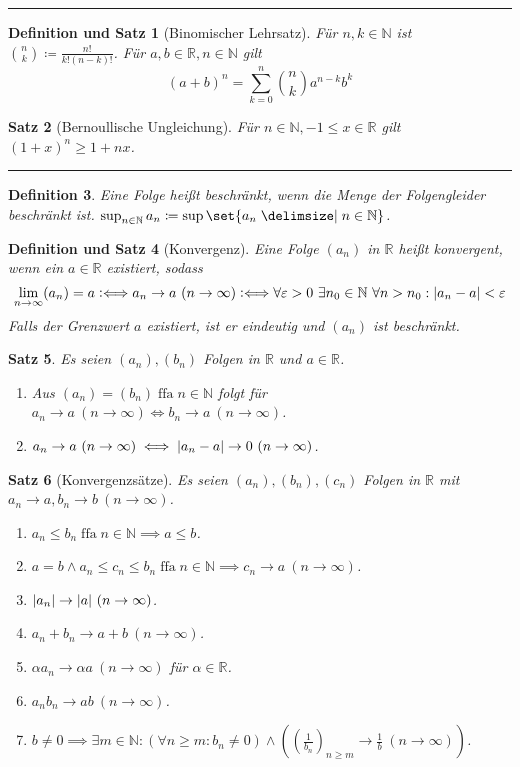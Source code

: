 \documentclass[a4paper]{article}
\newcounter{Sec}
\theoremstyle{marginbreak}
\newtheorem{definition}{Definition}[Sec]
\newtheorem{satz}[definition]{Satz}
\newtheorem{defsatz}[definition]{Definition und Satz}
\DeclareMathOperator{\ffa}{ffa}
\newcommand{\sep}{%
	\rule{\textwidth}{0.3pt}%
	\stepcounter{Sec}%
	}
\newcommand{\defiff}{\mathrel{\vcentcolon\Longleftrightarrow}}
\newcommand{\en}{~(n\to\infty)}
\begin{document}
	\sep
	\begin{defsatz}[Binomischer Lehrsatz]
		Für $n, k\in\mathbb{N}$ ist $\binom{n}{k}\coloneqq\frac{n!}{k!(n-k)!}$.
		Für $a, b\in\mathbb{R}, n\in\mathbb{N}$ gilt
		\[(a+b)^n = \sum_{k=0}^n\binom{n}{k}a^{n-k}b^k\]
	\end{defsatz}
	\begin{satz}[Bernoullische Ungleichung]
		Für $n\in\mathbb{N}, -1\leq x\in\mathbb{R}$ gilt $(1+x)^n\geq1+nx$.
	\end{satz}
	\sep
	\begin{definition}
		Eine Folge heißt beschränkt, wenn die Menge der Folgengleider beschränkt
		ist. $\sup_{n\in\mathbb{N}}a_n\coloneqq\sup\set{a_n\given n\in\mathbb{N}}$.
	\end{definition}
	\begin{defsatz}[Konvergenz]
		Eine Folge $(a_n)$ in $\mathbb{R}$ heißt konvergent, wenn ein $a\in\mathbb{R}$ existiert, sodass
		\[\lim_{n\to\infty}(a_n) = a \defiff a_n\to a\en \defiff
			\forall\varepsilon>0~\exists n_0\in\mathbb{N}~\forall n>n_0:\abs{a_n-a}<\varepsilon\]
		Falls der Grenzwert $a$ existiert, ist er eindeutig und $(a_n)$ ist beschränkt.
	\end{defsatz}
	\begin{satz}
		Es seien $(a_n), (b_n)$ Folgen in $\mathbb{R}$ und $a\in\mathbb{R}$.
		\begin{enumerate}[label=(\alph*)]
			\item Aus $(a_n) = (b_n) \ffa n\in\mathbb{N}$ folgt für $a_n\to a\en \iff b_n\to a\en$.
			\item $a_n\to a\en \iff \abs{a_n-a}\to0\en$.
		\end{enumerate}
	\end{satz}
	\begin{satz}[Konvergenzsätze]
		Es seien $(a_n), (b_n), (c_n)$ Folgen in $\mathbb{R}$ mit $a_n\to a,b_n\to b\en$.
		\begin{enumerate}[label=(\alph*)]
			\item $a_n\leq b_n\ffa n\in\mathbb{N}\implies a\leq b$.
			\item $a=b\wedge a_n\leq c_n\leq b_n\ffa n\in\mathbb{N}\implies c_n\to a\en$.
			\item $\abs{a_n}\to\abs{a}\en$.
			\item $a_n+b_n\to a+b\en$.
			\item $\alpha a_n\to\alpha a\en$ für $\alpha\in\mathbb{R}$.
			\item $a_n b_n\to ab\en$.
			\item $b\neq0\implies \exists m\in\mathbb{N}: (\forall n\geq m: b_n\neq0) \wedge ((\frac{1}{b_n})_{n\geq m}\to\frac{1}{b}\en)$.
		\end{enumerate}
	\end{satz}
\end{document}
